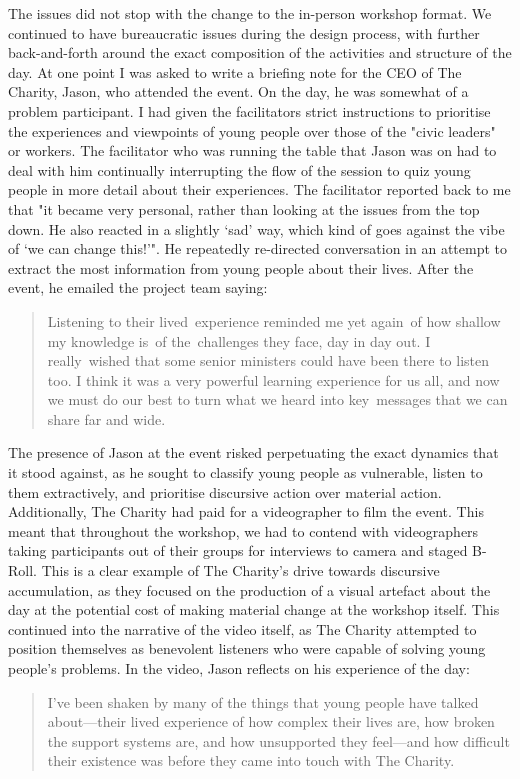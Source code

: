 The issues did not stop with the change to the in-person workshop format. We continued to have bureaucratic issues during the design process, with further back-and-forth around the exact composition of the activities and structure of the day. At one point I was asked to write a briefing note for the CEO of The Charity, Jason, who attended the event. On the day, he was somewhat of a problem participant. I had given the facilitators strict instructions to prioritise the experiences and viewpoints of young people over those of the "civic leaders" or workers. The facilitator who was running the table that Jason was on had to deal with him continually interrupting the flow of the session to quiz young people in more detail about their experiences. The facilitator reported back to me that "it became very personal, rather than looking at the issues from the top down. He also reacted in a slightly ‘sad’ way, which kind of goes against the vibe of ‘we can change this!’". He repeatedly re-directed conversation in an attempt to extract the most information from young people about their lives. After the event, he emailed the project team saying:
\blockquote{Listening to their lived experience reminded me yet again of how shallow my knowledge is of the challenges they face, day in day out. I really wished that some senior ministers could have been there to listen too.
I think it was a very powerful learning experience for us all, and now we must do our best to turn what we heard into key messages that we can share far and wide.}
The presence of Jason at the event risked perpetuating the exact dynamics that it stood against, as he sought to classify young people as vulnerable, listen to them extractively, and prioritise discursive action over material action. Additionally, The Charity had paid for a videographer to film the event. This meant that throughout the workshop, we had to contend with videographers taking participants out of their groups for interviews to camera and staged B-Roll. This is a clear example of The Charity's drive towards discursive accumulation, as they focused on the production of a visual artefact about the day at the potential cost of making material change at the workshop itself. This continued into the narrative of the video itself, as The Charity attempted to position themselves as benevolent listeners who were capable of solving young people's problems. In the video, Jason reflects on his experience of the day:

\blockquote{I've been shaken by many of the things that young people have talked about—their lived experience of how complex their lives are, how broken the support systems are, and how unsupported they feel—and how difficult their existence was before they came into touch with The Charity.}

